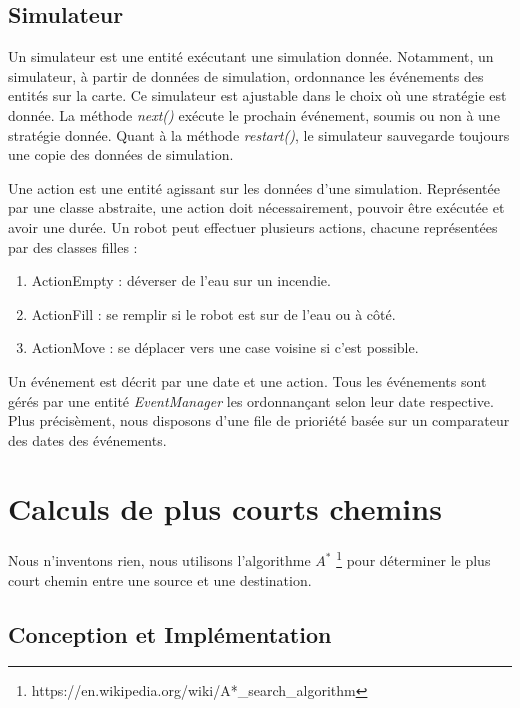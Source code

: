 \documentclass[a4paper, 10pt, french]{article}
\begin{document}
	\subsection{Simulateur}
	Un simulateur est une entité exécutant une simulation donnée. Notamment, un simulateur, à partir de données de simulation, ordonnance les événements des entités sur la carte. Ce simulateur est ajustable dans le choix où une stratégie est donnée. La méthode {\it next()} exécute le prochain événement, soumis ou non à une stratégie donnée. Quant à la méthode {\it restart()}, le simulateur sauvegarde toujours une copie des données de simulation. 
	\par\leavevmode\par
	Une action est une entité agissant sur les données d'une simulation. Représentée par une classe abstraite, une action doit nécessairement, pouvoir être exécutée et avoir une durée.
	Un robot peut effectuer plusieurs actions, chacune représentées par des classes filles :
	\begin{enumerate}
		\item ActionEmpty : déverser de l'eau sur un incendie.
		\item ActionFill : se remplir si le robot est sur de l'eau ou à côté.
		\item ActionMove : se déplacer vers une case voisine si c'est possible.
	\end{enumerate}
	\par\leavevmode\par
	Un événement est décrit par une date et une action. Tous les événements sont gérés par une entité {\it EventManager} les ordonnan{\c c}ant selon leur date respective. Plus précisèment, nous disposons d'une file de prioriété basée sur un comparateur des dates des événements.  

\section{Calculs de plus courts chemins}

	Nous n'inventons rien, nous utilisons l'algorithme $A^*$ \footnote{https://en.wikipedia.org/wiki/A*\_search\_algorithm} pour déterminer le plus court chemin entre une source et une destination. 

	\subsection{Conception et Implémentation}
\end{document}
